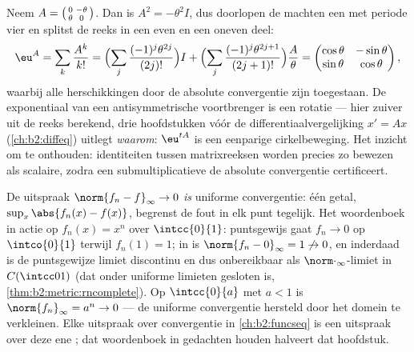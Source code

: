 \begin{example}\label{ex:b2:nvs:rotationexp}
Neem $A = \begin{psmallmatrix}0 & -\theta\\ \theta &
0\end{psmallmatrix}$. Dan is $A^2 = -\theta^2 I$, dus doorlopen de
machten een  met periode vier en splitst de reeks in een even
en een oneven deel:
\[
\eu^{A} = \sum_{k}\frac{A^k}{k!}
= \Bigl(\sum_{j}\frac{(-1)^j\theta^{2j}}{(2j)!}\Bigr) I
+ \Bigl(\sum_{j}\frac{(-1)^j\theta^{2j+1}}{(2j+1)!}\Bigr)
\frac{A}{\theta}
= \begin{pmatrix}
\cos\theta & -\sin\theta\\
\sin\theta & \cos\theta
\end{pmatrix},
\]
waarbij alle herschikkingen door de absolute convergentie zijn
toegestaan. De exponentiaal van een antisymmetrische voortbrenger
is een rotatie --- hier zuiver uit de reeks berekend, drie
hoofdstukken vóór de differentiaalvergelijking $x' = Ax$
(\cref{ch:b2:diffeq}) uitlegt \emph{waarom}: $\eu^{tA}$ is een
eenparige cirkelbeweging. Het inzicht om te onthouden:
identiteiten tussen matrixreeksen worden precies zo bewezen als
scalaire, zodra een submultiplicatieve  de absolute
convergentie certificeert.
\end{example}

\begin{example}\label{ex:b2:nvs:uniformdictionary}
De uitspraak $\norm{f_n - f}_\infty \to 0$ \emph{is} uniforme
convergentie: één getal, $\sup_x\abs{f_n(x) - f(x)}$, begrenst de
fout in elk punt tegelijk. Het woordenboek in actie op $f_n(x) =
x^n$ over $\intcc{0}{1}$: puntsgewijs gaat $f_n \to 0$ op
$\intco{0}{1}$ terwijl $f_n(1) = 1$; in  is $\norm{f_n -
0}_\infty = 1 \not\to 0$, en inderdaad is de puntsgewijze limiet
discontinu en dus onbereikbaar als $\norm\cdot_\infty$-limiet in
$C(\intcc01)$ (dat onder uniforme limieten gesloten is,
\cref{thm:b2:metric:rncomplete}). Op $\intcc{0}{a}$ met $a < 1$ is
$\norm{f_n}_\infty = a^n \to 0$ --- de uniforme convergentie
hersteld door het domein te verkleinen. Elke uitspraak over
convergentie in \cref{ch:b2:funcseq} is een uitspraak over deze ene
; dat woordenboek in gedachten houden halveert dat hoofdstuk.
\end{example}

